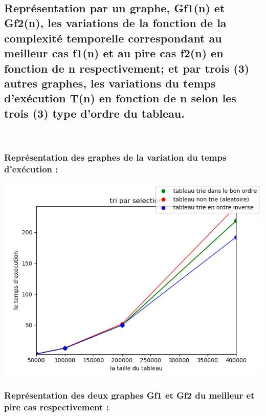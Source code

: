\documentclass[12pt]{article}
\begin{document}
\textrm{  }
\\
\color{black}





\subsection{Représentation par un graphe, Gf1(n) et Gf2(n), les variations de la fonction de la complexité temporelle correspondant au meilleur cas f1(n) et au pire cas f2(n) en fonction de n respectivement; et par trois (3) autres graphes,  les variations  du temps d'exécution T(n) en fonction de n selon les trois (3) type d'ordre du tableau.}
\texttt{  }\\

\subsubsection{Représentation des graphes de la variation du temps d'exécution :}


\includegraphics[width=1\textwidth]{graphe/Tri_selection.png}

\subsubsection{Représentation des deux graphes Gf1 et Gf2 du meilleur et pire cas respectivement :}
\end{document}
